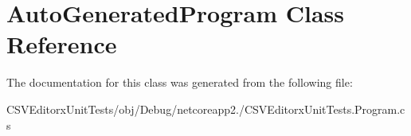 \hypertarget{class_auto_generated_program}{}\section{Auto\+Generated\+Program Class Reference}
\label{class_auto_generated_program}


The documentation for this class was generated from the following file\+:\begin{DoxyCompactItemize}
\item 
C\+S\+V\+Editorx\+Unit\+Tests/obj/\+Debug/netcoreapp2./C\+S\+V\+Editorx\+Unit\+Tests.\+Program.\+cs\end{DoxyCompactItemize}
